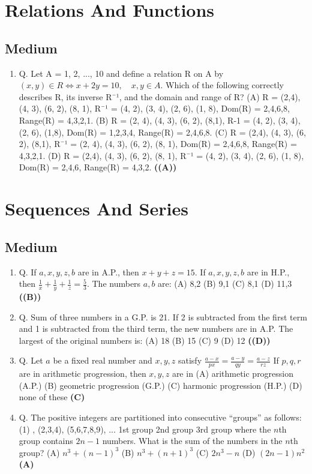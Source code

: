 \documentclass{article}
\begin{document}
\section{Relations And Functions}
\subsection{Medium}
\begin{enumerate}
\item Q. Let A = {1, 2, ..., 10} and define a relation R on A by
$(x, y) \in R \iff x + 2y = 10, \quad x, y \in A.$
Which of the following correctly describes R, its inverse R¯¹, and the domain and range of
R?
(A) R = {(2,4), (4, 3), (6, 2), (8, 1)}, R¯¹ = {(4, 2), (3, 4), (2, 6), (1, 8)},
Dom(R) = {2,4,6,8}, Range(R) = {4,3,2,1}.
(B) R = {(2, 4), (4, 3), (6, 2), (8,1)}, R-1 = {(4, 2), (3, 4), (2, 6), (1,8)},
Dom(R) = {1,2,3,4}, Range(R) = {2,4,6,8}.
(C) R = {(2,4), (4, 3), (6, 2), (8,1)}, R¯¹ = {(2, 4), (4, 3), (6, 2), (8, 1)},
Dom(R) = {2,4,6,8}, Range(R) = {4,3,2,1}.
(D) R = {(2,4), (4, 3), (6, 2), (8, 1)}, R¯¹ = {(4, 2), (3, 4), (2, 6), (1, 8)},
Dom(R) = {2,4,6}, Range(R) = {4,3,2}. \hfill \textbf{((A))}
\end{enumerate}
\section{Sequences And Series}
\subsection{Medium}
\begin{enumerate}
\item Q. If $a, x, y, z, b$ are in A.P., then $x + y + z = 15$. If $a, x, y, z, b$ are in H.P., then $\frac{1}{x} + \frac{1}{y} + \frac{1}{z} = \frac{5}{3}$. The numbers $a, b$ are:
(A) 8,2
(B) 9,1
(C) 8,1
(D) 11,3 \hfill \textbf{((B))}
\item Q. Sum of three numbers in a G.P. is 21. If 2 is subtracted from the first term and 1 is subtracted from the third term, the new numbers are in A.P. The largest of the original numbers is:
(A) 18
(B) 15
(C) 9
(D) 12 \hfill \textbf{((D))}
\item Q. Let $a$ be a fixed real number and $x, y, z$ satisfy
$\frac{a-x}{px} = \frac{a-y}{qy} = \frac{a-z}{rz}$
If $p, q, r$ are in arithmetic progression, then $x, y, z$ are in
(A) arithmetic progression (A.P.)
(B) geometric progression (G.P.)
(C) harmonic progression (H.P.)
(D) none of these \hfill \textbf{(C)}
\item Q. The positive integers are partitioned into consecutive “groups” as follows:
(1) , (2,3,4), (5,6,7,8,9), ...
1st group 2nd group 3rd group
where the $n$th group contains $2n - 1$ numbers. What is the sum of the numbers in the $n$th group?
(A) $n^3 + (n - 1)^3$
(B) $n^3 + (n + 1)^3$
(C) $2n^3 - n$
(D) $(2n - 1) n^2$ \hfill \textbf{(A)}
\end{enumerate}
\end{document}
